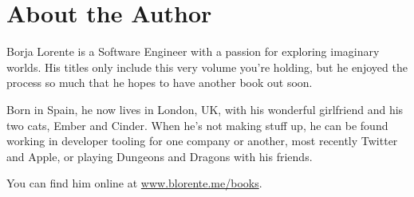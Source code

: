 \hypertarget{about-the-author}{%
\section{About the Author}\label{about-the-author}}

Borja Lorente is a Software Engineer with a passion for exploring
imaginary worlds. His titles only include this very volume you're
holding, but he enjoyed the process so much that he hopes to have
another book out soon.

Born in Spain, he now lives in London, UK, with his wonderful girlfriend
and his two cats, Ember and Cinder. When he's not making stuff up, he
can be found working in developer tooling for one company or another,
most recently Twitter and Apple, or playing Dungeons and Dragons with
his friends.

You can find him online at
\href{https://blorente.me/books}{www.blorente.me/books}.
